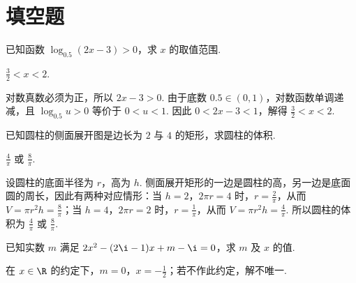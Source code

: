 \documentclass[UTF8,a4paper,oneside,11pt]{ctexbook}
\begin{document}
\section{填空题}

\begin{problem}

已知函数 \(\log_{0.5}(2x - 3) > 0\)，求 \(x\) 的取值范围\fillinblank{}.
\end{problem}

\begin{answer}
\(\frac{3}{2}<x<2\).
\end{answer}

\begin{solution}
对数真数必须为正，所以 \(2x-3>0\). 由于底数 \(0.5\in(0,1)\)，对数函数单调递减，且 \(\log_{0.5}u>0\) 等价于 \(0<u<1\). 因此 \(0<2x-3<1\)，解得 \(\frac{3}{2}<x<2\).
\end{solution}

\begin{problem}

已知圆柱的侧面展开图是边长为 \(2\) 与 \(4\) 的矩形，求圆柱的体积\fillinblank{}.
\end{problem}

\begin{answer}
\(\frac{4}{\pi}\) 或 \(\frac{8}{\pi}\).
\end{answer}

\begin{solution}
设圆柱的底面半径为 \(r\)，高为 \(h\). 侧面展开矩形的一边是圆柱的高，另一边是底面圆的周长，因此有两种对应情形：当 \(h=2\)，\(2\pi r=4\) 时，\(r=\frac{2}{\pi}\)，从而 \(V=\pi r^{2}h=\frac{8}{\pi}\)；当 \(h=4\)，\(2\pi r=2\) 时，\(r=\frac{1}{\pi}\)，从而 \(V=\pi r^{2}h=\frac{4}{\pi}\). 所以圆柱的体积为 \(\frac{4}{\pi}\) 或 \(\frac{8}{\pi}\).
\end{solution}

\begin{problem}

已知实数 \(m\) 满足 \(2x^{2} - (2\i - 1)x + m - \i = 0\)，求 \(m\) 及 \(x\) 的值\fillinblank{}.
\end{problem}

\begin{answer}
在 \(x\in\R\) 的约定下，\(m=0\)，\(x=-\frac{1}{2}\)；若不作此约定，解不唯一.
\end{answer}
\end{document}
